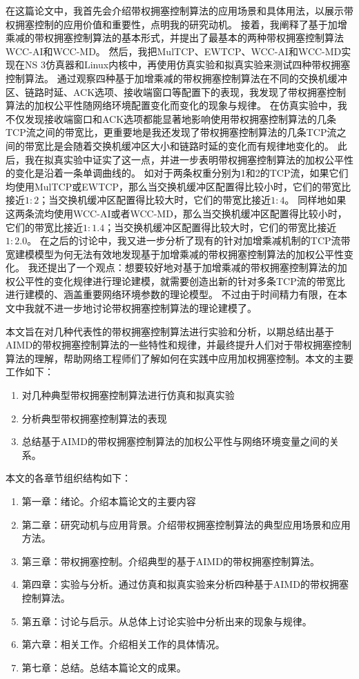 \documentclass[winfonts]{njuthesis}
\begin{document}
在这篇论文中，我首先会介绍带权拥塞控制算法的应用场景和具体用法，以展示带权拥塞控制的应用价值和重要性，点明我的研究动机。
接着，我阐释了基于加增乘减的带权拥塞控制算法的基本形式，并提出了最基本的两种带权拥塞控制算法WCC-AI和WCC-MD。
然后，我把MulTCP、EWTCP、WCC-AI和WCC-MD实现在NS 3\cite{NS3}仿真器和Linux内核中，再使用仿真实验和拟真实验来测试四种带权拥塞控制算法。
通过观察四种基于加增乘减的带权拥塞控制算法在不同的交换机缓冲区、链路时延、ACK选项、接收端窗口等配置下的表现，我发现了带权拥塞控制算法的加权公平性随网络环境配置变化而变化的现象与规律。
在仿真实验中，我不仅发现接收端窗口和ACK选项都能显著地影响使用带权拥塞控制算法的几条TCP流之间的带宽比，更重要地是我还发现了带权拥塞控制算法的几条TCP流之间的带宽比是会随着交换机缓冲区大小和链路时延的变化而有规律地变化的。
此后，我在拟真实验中证实了这一点，并进一步表明带权拥塞控制算法的加权公平性的变化是沿着一条单调曲线的。
如对于两条权重分别为1和2的TCP流，如果它们均使用MulTCP或EWTCP，那么当交换机缓冲区配置得比较小时，它们的带宽比接近$1:2$；当交换机缓冲区配置得比较大时，它们的带宽比接近$1:4$。
同样地如果这两条流均使用WCC-AI或者WCC-MD，那么当交换机缓冲区配置得比较小时，它们的带宽比接近$1:1.4$；当交换机缓冲区配置得比较大时，它们的带宽比接近$1:2.0$。
在之后的讨论中，我又进一步分析了现有的针对加增乘减机制的TCP流带宽建模模型为何无法有效地发现基于加增乘减的带权拥塞控制算法的加权公平性变化。
我还提出了一个观点：想要较好地对基于加增乘减的带权拥塞控制算法的加权公平性的变化规律进行理论建模，就需要创造出新的针对多条TCP流的带宽比进行建模的、涵盖重要网络环境参数的理论模型。
不过由于时间精力有限，在本文中我就不进一步地讨论带权拥塞控制算法的理论建模了。

本文旨在对几种代表性的带权拥塞控制算法进行实验和分析，以期总结出基于AIMD的带权拥塞控制算法的一些特性和规律，并最终提升人们对于带权拥塞控制算法的理解，帮助网络工程师们了解如何在实践中应用加权拥塞控制。本文的主要工作如下：
\begin{enumerate}
\item 对几种典型带权拥塞控制算法进行仿真和拟真实验

\item 分析典型带权拥塞控制算法的表现

\item 总结基于AIMD的带权拥塞控制算法的加权公平性与网络环境变量之间的关系。
\end{enumerate}

本文的各章节组织结构如下：
\begin{enumerate}
\item 第一章：绪论。介绍本篇论文的主要内容
\item 第二章：研究动机与应用背景。介绍带权拥塞控制算法的典型应用场景和应用方法。
\item 第三章：带权拥塞控制。介绍典型的基于AIMD的带权拥塞控制算法。
\item 第四章：实验与分析。通过仿真和拟真实验来分析四种基于AIMD的带权拥塞控制算法。
\item 第五章：讨论与启示。从总体上讨论实验中分析出来的现象与规律。
\item 第六章：相关工作。介绍相关工作的具体情况。
\item 第七章：总结。总结本篇论文的成果。
\end{enumerate}
\end{document}
